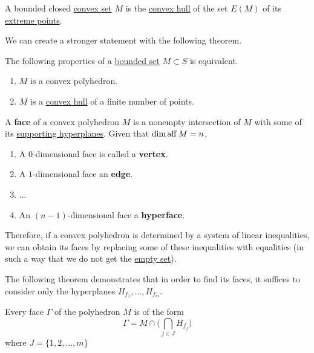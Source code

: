   \begin{theorem}
    \label{thm:krein-milman-theorem-for-bounded-convex-sets}
    A bounded closed \hyperref[def:convex-set]{convex set} $M$ is the \hyperref[def:convex-hull]{convex hull} of the set $E(M)$ of its \hyperref[def:extreme-point]{extreme points}. 
  \end{theorem}

  We can create a stronger statement with the following theorem. 

  \begin{theorem}
    \label{thm:minkowski-weyl-theorem}
    The following properties of a \hyperref[pst-def:bounded-set]{bounded set} $M \subset S$ is equivalent.
    \begin{enumerate}
      \item $M$ is a convex polyhedron. 
      \item $M$ is a \hyperref[def:convex-hull]{convex hull} of a finite number of points. 
    \end{enumerate}
  \end{theorem}

  \begin{definition}
    \label{def:face-of-a-convex-polyhedron}
    A \textbf{face} of a convex polyhedron $M$ is a nonempty intersection of $M$ with some of its \hyperref[def:supporting-hyperplane]{supporting hyperplanes}. Given that $\dim \operatorname{aff} M = n$, 
    \begin{enumerate}
      \item A $0$-dimensional face is called a \textbf{vertex}. 
      \item A $1$-dimensional face an \textbf{edge}. 
      \item ...
      \item An $(n-1)$-dimensional face a \textbf{hyperface}. 
    \end{enumerate}
  \end{definition}

  Therefore, if a convex polyhedron is determined by a system of linear inequalities, we can obtain its faces by replacing some of these inequalities with equalities (in such a way that we do not get the \hyperref[st-def:empty-set]{empty set}). 

  The following theorem demonstrates that in order to find its faces, it suffices to consider only the hyperplanes $H_{f_1}, ..., H_{f_m}$. 

  \begin{theorem}
    \label{thm:form-of-a-face-of-a-polyhedron}
    Every face $\Gamma$ of the polyhedron $M$ is of the form
    \begin{equation}
      \Gamma = M \cap \bigg( \bigcap_{j \in J} H_{f_j} \bigg)
    \end{equation}
    where $J = \{1, 2, ..., m\}$
  \end{theorem}

